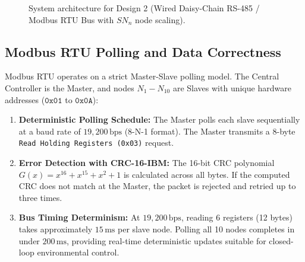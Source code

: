 \documentclass[12pt]{article}
\begin{document}
\begin{figure}[H]
{
}
\caption{System architecture for Design 2 (Wired Daisy-Chain RS-485 / Modbus RTU Bus with $SN_n$ node scaling).}
\label{fig:design2_arch}
\end{figure}

\subsection{Modbus RTU Polling and Data Correctness}
Modbus RTU operates on a strict Master-Slave polling model. The Central Controller is the Master, and nodes $N_1 - N_{10}$ are Slaves with unique hardware addresses ($\texttt{0x01}$ to $\texttt{0x0A}$):
\begin{enumerate}
    \item \textbf{Deterministic Polling Schedule:} The Master polls each slave sequentially at a baud rate of $19{,}200\,\text{bps}$ (8-N-1 format). The Master transmits a 8-byte \texttt{Read Holding Registers (0x03)} request.
    \item \textbf{Error Detection with CRC-16-IBM:} The 16-bit CRC polynomial $G(x) = x^{16} + x^{15} + x^2 + 1$ is calculated across all bytes. If the computed CRC does not match at the Master, the packet is rejected and retried up to three times.
    \item \textbf{Bus Timing Determinism:} At $19{,}200\,\text{bps}$, reading 6 registers (12 bytes) takes approximately $15\,\text{ms}$ per slave node. Polling all 10 nodes completes in under $200\,\text{ms}$, providing real-time deterministic updates suitable for closed-loop environmental control.
\end{enumerate}
\end{document}

